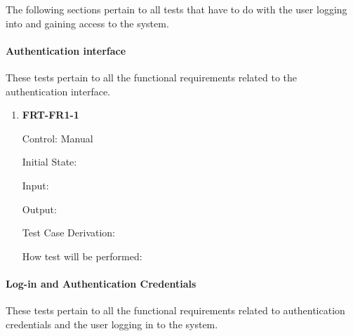 \documentclass[12pt, titlepage]{article}
\begin{document}
The following sections pertain to all tests that have to do with the user logging into and gaining access to the system.

\paragraph{Authentication interface}

These tests pertain to all the functional requirements related to the authentication interface.

\begin{enumerate}

\item{\textbf{FRT-FR1-1}}

Control: Manual
          
Initial State: 
          
Input: 

Output: 

Test Case Derivation: 
          
How test will be performed: 

\end{enumerate}


\paragraph{Log-in and Authentication Credentials}

These tests pertain to all the functional requirements related to authentication credentials and the user logging in to the system.
\end{document}
